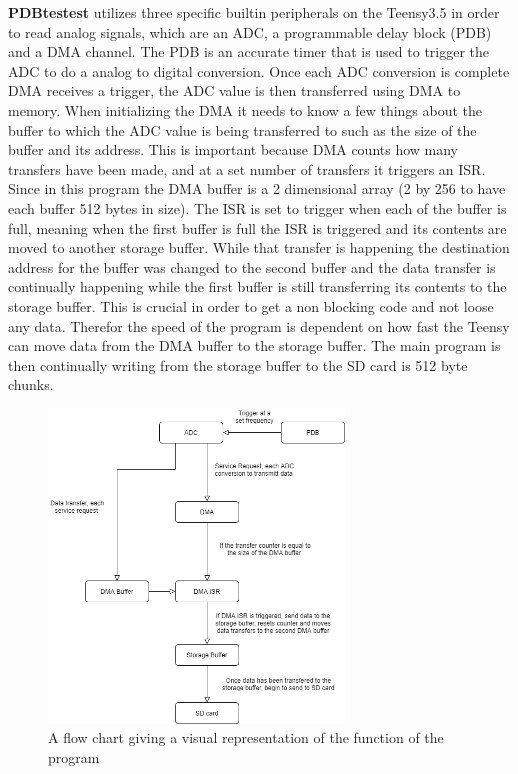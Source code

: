 \textbf{PDBtestest} utilizes three specific builtin peripherals on the Teensy3.5 in order to read analog signals, which are an ADC, a programmable delay block (PDB) and a DMA channel.
The PDB is an accurate timer that is used to trigger the ADC to do a analog to digital conversion.
Once each ADC conversion is complete DMA receives a trigger, the ADC value is then transferred using DMA to memory.
When initializing the DMA it needs to know a few things about the buffer to which the ADC value is being transferred to such as the size of the buffer and its address. 
This is important because DMA counts how many transfers have been made, and at a set number of transfers it triggers an ISR.
Since in this program the DMA buffer is a 2 dimensional array (2 by 256 to have each buffer 512 bytes in size).
The ISR is set to trigger when each of the buffer is full, meaning when the first buffer is full the ISR is triggered and its contents are moved to another storage buffer.
While that transfer is happening the destination address for the buffer was changed to the second buffer and the data transfer is continually happening while the first buffer is still transferring its contents to the storage buffer.
This is crucial in order to get a non blocking code and not loose any data.
Therefor the speed of the program is dependent on how fast the Teensy can move data from the DMA buffer to the storage buffer.
The main program is then continually writing from the storage buffer to the SD card is 512 byte chunks.

\begin{figure}[h]
    \centering
    \includegraphics[width=0.70\textwidth]{graphics/flowChart.png}
    \caption{A flow chart giving a visual representation of the function of the program}
    \label{fig:CodeFlow}
\end{figure}



